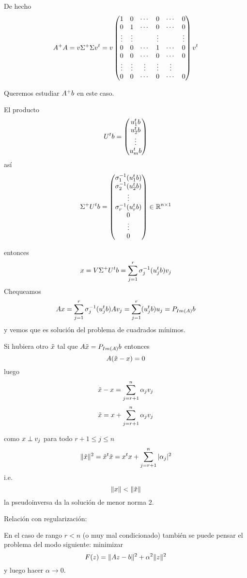 De hecho
$$
\Ab^+\Ab=
\vb\Sigma^+\Sigma\vb^t=
\vb\begin{pmatrix}
1&0&\cdots &0&\cdots &0\\
0&1&\cdots &0&\cdots &0\\
\vdots&\vdots&&\vdots&&\vdots\\
0&0&\cdots &1&\cdots &0\\
0&0&\cdots &0&\cdots &0\\
\vdots &\vdots&\vdots &\vdots &\vdots\\

0&0& \cdots &0&\cdots &0\\

\end{pmatrix}
\vb^t
$$

Queremos estudiar $\Ab^+\bb$ en este caso.

El producto
$$
\Ub^t\bb=
\begin{pmatrix}
\ub_1^t\bb\\
\ub_2^t\bb\\
\vdots\\
\ub_m^t\bb
\end{pmatrix}
$$
así
$$
\Sigma^+\Ub^t\bb=
\begin{pmatrix}
\sigma_1^{-1}(\ub_1^t\bb)\\
\sigma_2^{-1}(\ub_2^t\bb)\\
\vdots\\
\sigma_r^{-1}(\ub_r^t\bb)\\
0\\
\vdots\\
0
\end{pmatrix} \in \R^{n\times 1}
$$

entonces
$$
\xb=\Vb\Sigma^+\Ub^t\bb=
\sum_{j=1}^r\sigma_j^{-1}(\ub_j^t\bb)\vb_j
$$
Chequeamos
$$
\Ab\xb=\sum_{j=1}^r\sigma_j^{-1}(\ub_j^t\bb)\Ab\vb_j=\sum_{j=1}^r(\ub_j^t\bb)\ub_j=P_{Im(A)}\bb
$$
y vemos que es solución del problema de cuadrados mínimos.

Si hubiera otro $\tilde \xb$ tal que $\Ab\tilde\xb=P_{Im(A)}\bb$ entonces
$$
\Ab(\tilde\xb-\xb)=\cero
$$
luego
$$
\tilde\xb-\xb=\sum_{j=r+1}^n\alpha_j\vb_j
$$
$$
\tilde\xb= \xb+\sum_{j=r+1}^n\alpha_j\vb_j
$$

como $\xb\perp \vb_j$ para todo $r+1\le j\le n$
$$
\|\tilde\xb\|^2=\tilde\xb^t\tilde\xb=\xb^t\xb+\sum_{j=r+1}^n|\alpha_j|^2
$$
i.e.
$$
\|\xb\|<\|\tilde\xb\|
$$
la pseudoinversa da la solución de menor norma $2$.

 \centerline {Relación con regularización:}

En el caso de rango $r<n$ (o muy mal condicionado) también se puede pensar el problema del modo siguiente: minimizar
 $$
 F(\zb)=\|\Ab\zb-\bb\|^2+\alpha^2\|\zb\|^2
 $$
 y luego hacer $\alpha\to 0$.

